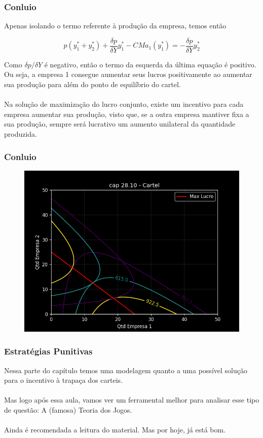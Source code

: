 \documentclass{beamer}[10]
\begin{document}
\begin{frame}
	\frametitle{Conluio}

	Apenas isolando o termo referente à produção da empresa, temos então

	$$ p(y_1^* + y_2^*) + \frac{\delta p}{\delta Y}y_1^* - CMa_1(y_1^*) = - \frac{\delta p}{\delta Y}y_2^* $$ 

	Como $\delta p / \delta Y$ é negativo, então o termo da esquerda da última equação é positivo. Ou seja, a empresa 1 consegue aumentar seus lucros positivamente ao aumentar sua produção para além do ponto de equilíbrio do cartel.
	\\~\\
	Na solução de maximização do lucro conjunto, existe um incentivo para cada empresa aumentar sua produção, visto que, se a outra empresa mantiver fixa a sua produção, sempre será lucrativo um aumento unilateral da quantidade produzida.

\end{frame}

\begin{frame}
	\frametitle{Conluio}

	\begin{figure}[H]
		\centering
		\includegraphics[scale=0.55]{cap28_10-cartel.png}
	\end{figure}

\end{frame}


\begin{frame}
	\frametitle{Estratégias Punitivas}

	Nessa parte do capítulo temos uma modelagem quanto a uma possível solução para o incentivo à trapaça dos carteis.
	\\~\\
	Mas logo após essa aula, vamos ver um ferramental melhor para analisar esse tipo de questão: A (famosa) Teoria dos Jogos.
	\\~\\
	Ainda é recomendada a leitura do material. Mas por hoje, já está bom.

\end{frame}
\end{document}
